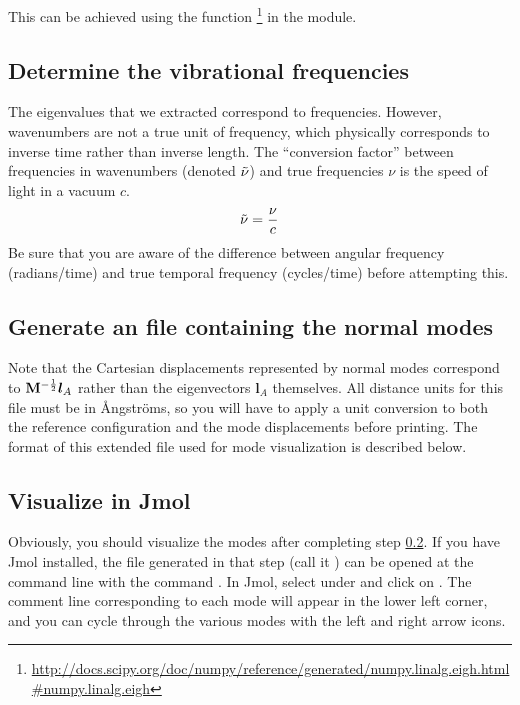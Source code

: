 \documentclass[11pt]{article}
\begin{document}
This can be achieved using the  function
\footnote{\url{http://docs.scipy.org/doc/numpy/reference/generated/numpy.linalg.eigh.html\#numpy.linalg.eigh}}
in the  module.

\subsection{Determine the vibrational frequencies}

The eigenvalues that we extracted correspond to frequencies. However,
wavenumbers are not a true unit of frequency, which physically corresponds to
inverse time rather than inverse length. The ``conversion factor'' between
frequencies in wavenumbers (denoted $\tilde{\nu}$) and true frequencies $\nu$ is the
speed of light in a vacuum $c$.
\begin{align*}
    \tilde{\nu} = \dfrac{\nu}{c}
\end{align*}
Be sure that you are aware of the difference between angular frequency
(radians/time) and true temporal frequency (cycles/time) before attempting
this.

\subsection{Generate an  file containing the normal modes}
\label{generate-xyz-modes}
Note that the Cartesian displacements represented by normal modes correspond to
$\mathbf{M}^{-\frac{1}{2}}\bm{l}_A$ rather than the eigenvectors $\bm{l}_A$
themselves. All distance units for this file must be in \AA ngstr\"oms, so you
will have to apply a unit conversion to both the reference configuration and
the mode displacements before printing. The format of this extended 
file used for mode visualization is described below.

\subsection{Visualize in Jmol}
Obviously, you should visualize the modes after completing step
\ref{generate-xyz-modes}. If you have Jmol installed, the file generated in
that step (call it ) can be opened at the command line with the
command . In Jmol, select  under
 and click on . The comment line corresponding
to each mode will appear in the lower left corner, and you can cycle through
the various modes with the left and right arrow icons.
\end{document}
